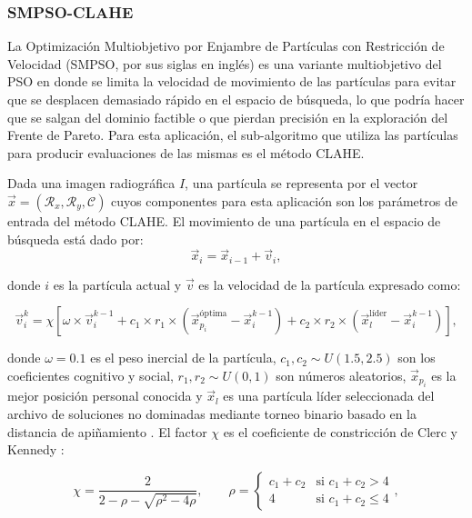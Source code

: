\documentclass[sigplan,screen]{acmart}
\begin{document}
\subsubsection{SMPSO-CLAHE \cite{Nebro2009}}
La Optimización Multiobjetivo por Enjambre de Partículas con Restricción de Velocidad (SMPSO, por sus siglas en inglés) es una variante multiobjetivo del PSO en donde se limita la velocidad de movimiento de las partículas para evitar que se desplacen demasiado rápido en el espacio de búsqueda, lo que podría hacer que se salgan del dominio factible o que pierdan precisión en la exploración del Frente de Pareto. Para esta aplicación, el sub-algoritmo que utiliza las partículas para producir evaluaciones de las mismas es el método CLAHE.\par
Dada una imagen radiográfica $I$, una partícula se representa por el vector $\vec{x}=(\mathcal{R}_x,\mathcal{R}_y,\mathcal{C})$ cuyos componentes para esta aplicación son los parámetros de entrada del método CLAHE. El movimiento de una partícula en el espacio de búsqueda está dado por:
\begin{equation}
    \vec{x}_i=\vec{x}_{i-1}+\vec{v}_i,
\label{eq:eq4}
\end{equation}
\par
\noindent donde $i$ es la partícula actual y $\vec{v}$  es la velocidad de la partícula expresado como:

\begin{equation}
    \vec{v}_i^{k} = \chi \left[ \omega \times \vec{v}_i^{k-1} + c_1 \times r_1 \times (\vec{x}_{p_i}^{\text{óptima}} - \vec{x}_i^{k-1}) + c_2 \times r_2 \times (\vec{x}_l^{\text{líder}} - \vec{x}_i^{k-1}) \right],
\label{eq:eq5}
\end{equation}

\noindent donde $\omega = 0.1$ es el peso inercial de la partícula, $c_1, c_2 \sim U(1.5, 2.5)$ son los coeficientes cognitivo y social, $r_1, r_2 \sim U(0,1)$ son números aleatorios, $\vec{x}_{p_i}$ es la mejor posición personal conocida y $\vec{x}_l$ es una partícula líder seleccionada del archivo de soluciones no dominadas mediante torneo binario basado en la distancia de apiñamiento \cite{Deb2002}. El factor $\chi$ es el coeficiente de constricción de Clerc y Kennedy \cite{Clerc2002}:

\begin{equation}
    \chi = \frac{2}{2-\rho-\sqrt{\rho^2-4\rho}}, \qquad
    \rho = \begin{cases} c_1+c_2 & \text{si } c_1+c_2>4\\ 4 & \text{si } c_1+c_2\leq 4 \end{cases},
\label{eq:eqchi}
\end{equation}
\end{document}
